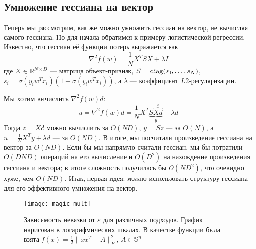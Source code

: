 \documentclass[a4paper, 12pt]{article}
\begin{document}

\subsection{Умножение гессиана на вектор}
Теперь мы рассмотрим, как же можно умножить гессиан на вектор, не вычисляя самого гессиана. Но для начала обратимся к примеру логистической регрессии. Известно, что гессиан её функции потерь выражается как
$$\nabla^2 f(w) = \frac{1}{N} X^TSX + \lambda I$$
где $X \in \mathbb{R}^{N \times D}$ --- матрица объект-признак, $S = \mathrm{diag}(s_1, \dots, s_N)$, $s_i = \sigma(y_iw^Tx_i)(1 - \sigma(y_iw^Tx_i))$, а $\lambda$ --- коэффициент $L$2-регуляризации.

Мы хотим вычислить $\nabla^2 f(w) d$:
$$u = \nabla^2 f(w) d = \frac{1}{N}X^T\underbrace{S\overbrace{Xd}^{z}}_{y} + \lambda d$$
Тогда $z = Xd$ можно вычислить за $O(ND)$, $y = Sz$ --- за $O(N)$, а $u = \frac{1}{N}X^Ty + \lambda d$ --- за $O(ND)$. В итоге, мы посчитали произведение гессиана на вектор за $O(ND)$. Если бы мы напрямую считали гессиан, мы бы потратили $O(DND)$ операций на его вычисление и $O(D^2)$ на нахождение произведения гессиана и вектора; в итоге сложность получилась бы $O(ND^2)$, что очевидно хуже, чем $O(ND)$. Итак, первая идея: можно использовать структуру гессиана для его эффективного умножения на вектор.

\begin{figure*}[t]
    \centering
    \texttt{[image: magic\_mult]}
    \caption{Зависимость невязки от $\varepsilon$ для различных подходов. График нарисован в логарифмических шкалах. В качестве функции была взята $f(x) = \frac{1}{2} \|xx^T + A\|_F^2$, $A \in \mathbb{S}^n$}\label{gr:mm}
\end{figure*}
\end{document}
